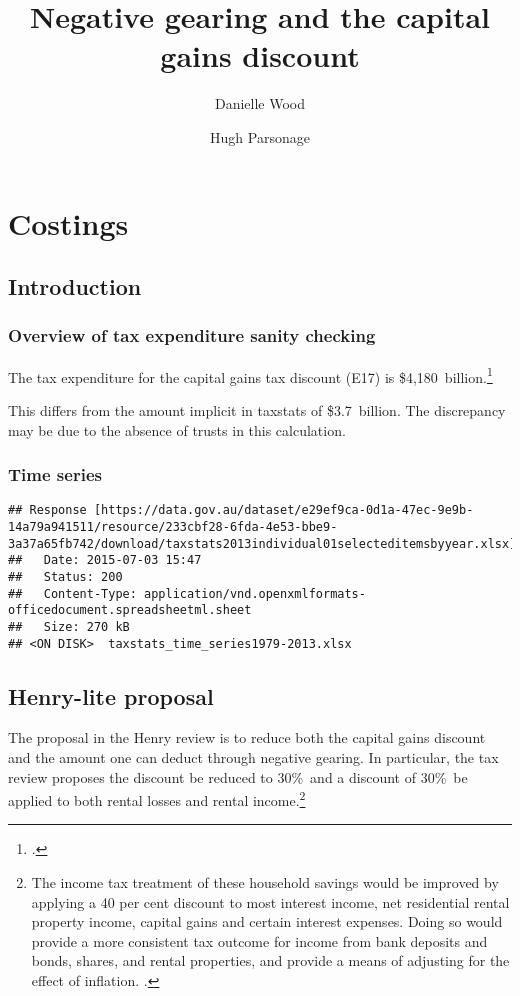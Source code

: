 \documentclass{grattan}\usepackage[]{graphicx}\usepackage[]{color}
\title{Negative gearing and the capital gains discount}
\author{Danielle Wood \and Hugh Parsonage}
\makeatletter
\newenvironment{kframe}{%
 \def\at@end@of@kframe{}%
 \ifinner\ifhmode%
  \def\at@end@of@kframe{\end{minipage}}%
  \begin{minipage}{\columnwidth}%
 \fi\fi%
 \def\FrameCommand##1{\hskip\@totalleftmargin \hskip-\fboxsep
 \colorbox{shadecolor}{##1}\hskip-\fboxsep
     \hskip-\linewidth \hskip-\@totalleftmargin \hskip\columnwidth}%
 \MakeFramed {\advance\hsize-\width
   \@totalleftmargin\z@ \linewidth\hsize
   \@setminipage}}%
 {\par\unskip\endMakeFramed%
 \at@end@of@kframe}
\newenvironment{knitrout}{}{} %
\makeatother
\begin{document}
\clearpage





\raggedbottom
\contentspage
\listoffigures
\listoftables

\chapter{Costings}
\section{Introduction}
\subsection{Overview of tax expenditure sanity checking}
The tax expenditure for the capital gains tax discount (E17) is \$4,180~billion.\footcite{TaxExpenditures201213} 


This differs from the amount implicit in taxstats of \$3.7~billion. The discrepancy may be due to the absence of trusts in this calculation. 

\subsection{Time series}
\begin{knitrout}
\color{fgcolor}\begin{kframe}
\begin{verbatim}
## Response [https://data.gov.au/dataset/e29ef9ca-0d1a-47ec-9e9b-14a79a941511/resource/233cbf28-6fda-4e53-bbe9-3a37a65fb742/download/taxstats2013individual01selecteditemsbyyear.xlsx]
##   Date: 2015-07-03 15:47
##   Status: 200
##   Content-Type: application/vnd.openxmlformats-officedocument.spreadsheetml.sheet
##   Size: 270 kB
## <ON DISK>  taxstats_time_series1979-2013.xlsx
\end{verbatim}
\end{kframe}
\end{knitrout}

\section{Henry-lite proposal}
The proposal in the Henry review is to reduce both the capital gains discount and the amount one can deduct through negative gearing. In particular, the tax review proposes the discount be reduced to 30\%\ and a discount of 30\%\ be applied to both rental losses and rental income.\footnote{The income tax treatment of these household savings would be improved by applying a
40 per cent discount to most interest income, net residential rental property income, capital
gains and certain interest expenses. Doing so would provide a more consistent tax
outcome for income from bank deposits and bonds, shares, and rental properties, and
provide a means of adjusting for the effect of inflation. \textcite{Treasury2010a}.}
\end{document}

